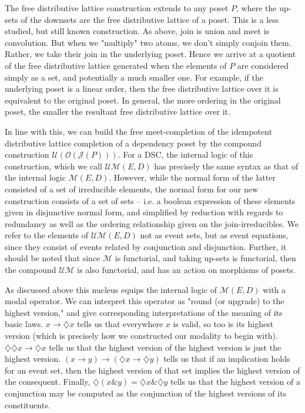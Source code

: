 \documentclass[hoptionsi,review,format=acmsmall]{acmart}
\theoremstyle{definition}
\newcommand{\Mcc}{\mathcal{M}}
\newcommand{\UMc}{\mathcal{UM}}
\newcommand{\Oc}{\mathcal{O}}
\newcommand{\Ucc}{\mathcal{U}}
\newcommand{\Jc}{\mathcal{J}}
\newcommand{\band}{\mathbin{\&}}
\newcommand{\Dia}{\diamondsuit}
\begin{document}
The free distributive lattice construction extends to any poset \(P\), where the up-sets of the downsets are the free distributive lattice of a poset. This is a less studied, but still known construction. As above, join is union and meet is convolution. But when we "multiply" two atoms, we don't simply conjoin them. Rather, we take their join in the underlying poset. Hence we arrive at a quotient of the free distributive lattice generated when the elements of \(P\) are considered simply as a set, and potentially a much smaller one. For example, if the underlying poset is a linear order, then the free distributive lattice over it is equivalent to the original poset. In general, the more ordering in the original poset, the smaller the resultant free distributive lattice over it.

 In line with this, we can build the free meet-completion of the idempotent distributive lattice completion of a dependency poset by the compound construction \(\Ucc(\Oc(\Jc(P)))\). For a DSC, the internal logic of this construction, which we call \(\UMc(E,D)\) has precisely the same syntax as that of the internal logic \(\Mcc(E,D)\). However, while the normal form of the latter consisted of a set of irreducible elements, the normal form for our new construction consists of a set of sets -- i.e. a boolean expression of these elements given in disjunctive normal form, and simplified by reduction with regards to redundancy as well as the ordering relationship given on the join-irreducibles. We refer to the elements of \(\UMc(E,D)\) not as event sets, but as event equations, since they consist of events related by conjunction and disjunction. Further, it should be noted that since \(\Mcc\) is functorial, and taking up-sets is functorial, then the compound \(\UMc\) is also functorial, and has an action on morphisms of posets.
 


As discussed above this nucleus equips the internal logic of \(\Mcc(E,D)\) with a modal operator. We can interpret this operator as "round (or upgrade) to the highest version," and give corresponding interpretations of the meaning of its basic laws. \(x \rightarrow \Dia{x}\) tells us that everywhere \(x\) is valid, so too is its highest version (which is precisely how we constructed our modality to begin with). \(\Dia\Dia{x} \rightarrow \Dia{x}\) tells us that the highest version of the highest version is just the highest version. \((x \rightarrow y) \rightarrow (\Dia{x} \rightarrow \Dia{y})\)  tells us that if an implication holds for an event set, then the highest version of that set implies the highest version of the consequent. Finally, \(\Dia(x \band y) = \Dia{x} \band \Dia{y}\) tells us that the highest version of a conjunction may be computed as the conjunction of the highest versions of its constituents.
\end{document}
